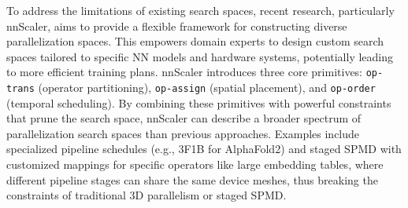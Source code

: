 
To address the limitations of existing search spaces, recent research, particularly nnScaler, aims to provide a flexible framework for constructing diverse parallelization spaces. This empowers domain experts to design custom search spaces tailored to specific NN models and hardware systems, potentially leading to more efficient training plans. nnScaler introduces three core primitives: \texttt{op-trans} (operator partitioning), \texttt{op-assign} (spatial placement), and \texttt{op-order} (temporal scheduling). By combining these primitives with powerful constraints that prune the search space, nnScaler can describe a broader spectrum of parallelization search spaces than previous approaches. Examples include specialized pipeline schedules (e.g., 3F1B for AlphaFold2) and staged SPMD with customized mappings for specific operators like large embedding tables, where different pipeline stages can share the same device meshes, thus breaking the constraints of traditional 3D parallelism or staged SPMD.

